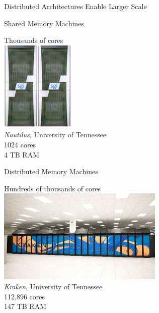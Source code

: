 \begin{frame}{Distributed Architectures Enable Larger Scale}
  \begin{center}
    \begin{minipage}[t]{.47\textwidth}
      \begin{block}{Shared Memory Machines}
        \begin{center}
          Thousands of cores\\[.2cm]
          \includegraphics[scale=.65]{../common/pics/nautilus}\\
          {\tiny \emph{Nautilus}, University of Tennessee\\1024 cores
            \\4 TB RAM\\}
        \end{center}
      \end{block}
    \end{minipage}
    \hspace{.1cm}
    \begin{minipage}[t]{.47\textwidth}
      \begin{block}{Distributed Memory Machines}
        \begin{center}
          Hundreds of thousands of cores\\[.2cm]
          \includegraphics[width=.95\textwidth]{../common/pics/kraken}\\
          {\tiny \emph{Kraken}, University of Tennessee\\ 112,896
            cores \\147 TB RAM\\}
        \end{center}
      \end{block}
    \end{minipage}
  \end{center}
\end{frame}

